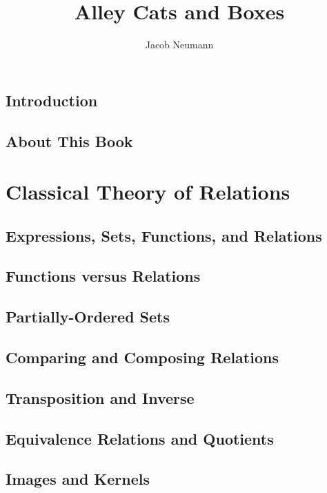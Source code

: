 \documentclass[11pt]{book}
\author{Jacob Neumann}
\title{Alley Cats and Boxes}
\begin{document}
\maketitle

\tableofcontents


\section{Introduction}

\section{About This Book}


\chapter{Classical Theory of Relations}

\section{Expressions, Sets, Functions, and Relations}

    

\section{Functions versus Relations}

\section{Partially-Ordered Sets}

\section{Comparing and Composing Relations}

\section{Transposition and Inverse}

\section{Equivalence Relations and Quotients}

\section{Images and Kernels}
\end{document}
